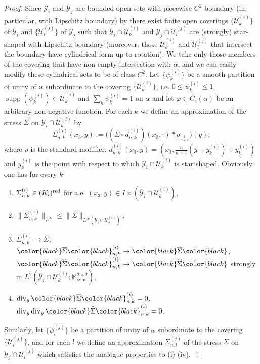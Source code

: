 \documentclass[reqno,10pt]{amsart}
\numberwithin{equation}{section}
\theoremstyle{remark}
\newcommand{\BLACK}{\color{black}}
\newcommand{\PINK}{\color{black}}
\newcommand{\calU}{\mathcal{U}}
\newcommand{\calY}{\mathcal{Y}}
\DeclareMathOperator{\sym}{sym}
\DeclareMathOperator{\supp}{supp}
\newcommand{\closure}[1]{\overline{#1}}
\renewcommand{\div}{\operatorname{div}}
\newcommand{\zerothI}[1]{\overline{#1}}
\newcommand{\firstI}[1]{\widehat{#1}}
\begin{document}
\begin{proof}
Since $\calY_i$ and $\calY_j$ are bounded open sets with piecewise $C^2$ boundary (in particular, with Lipschitz boundary) by \cite[Proposition 2.5.4]{Carbone.DeArcangelis.2002} there exist finite open coverings $\{\calU^{(i)}_k\}$ of $\closure{\calY}_i$ and $\{\calU^{(j)}_l\}$ of $\closure{\calY}_j$ such that $\calY_i \cap \calU^{(i)}_k$ and $\calY_j \cap \calU^{(j)}_l$ are (strongly) star-shaped with Lipschitz boundary
(moreover, those $\calU^{(i)}_k$ and $\calU^{(j)}_l$ that intersect the boundary have cylindrical form up to rotation). 
We take only those members of the covering that have non-empty intersection with $\alpha$, and we can easily modify these cylindrical sets to be of class $C^2$. 
Let $\{\psi^{(i)}_k\}$ be a smooth partition of unity of $\alpha$ subordinate to the covering $\{\calU^{(i)}_k\}$, i.e. $0 \leq \psi^{(i)}_k\leq 1$, $\supp(\psi_k^{(i)}) \subset \calU_k^{(i)}$ and $\sum_{k} \psi^{(i)}_k = 1$ on $\alpha$ and let $\varphi \in C_c(\alpha)$ be an arbitrary non-negative function. 
For each $k$ we define an approximation of the stress $\Sigma$ on $\calY_i \cap \calU^{(i)}_k$ 
by
\begin{equation} \label{prop4}
	\Sigma^{(i)}_{n,k}(x_3,y) := \big(\left( \Sigma \circ d_{n,k}^{(i)} \right)(x_3,\cdot) \ast \rho_{\frac{1}{n+1}}\big)(y),
\end{equation}
where 
$\rho$ is the standard mollifier,
$d^{(i)}_{n,k}(x_3,y) = \left( x_3,\tfrac{n}{n+1}(y-y_k^{(i)})+y_k^{(i)}\right)$ and $y_k^{(i)}$ is the point with respect to which $\calY_i \cap \calU^{(i)}_k$ is star shaped. 
Obviously one has for every $k$ 
\begin{enumerate}[label=(\roman*)]
\item $\Sigma_{n,k}^{(i)} \in (K_i)^{\rm red}$ for a.e. $(x_3,y) \in I \times (\closure{\calY}_i\cap \calU^{(i)}_k)$,
\item $\|\Sigma^{(i)}_{n,k}\|_{L^\infty} \leq \|\Sigma\|_{L^{\infty}(\calY_i \cap \calU^{(i)}_k)} $, 
\item $\Sigma^{(i)}_{n,k} \to \Sigma$,\, ${\PINK\zerothI{\Sigma}\BLACK}^{(i)}_{n,k} \to {\PINK\zerothI{\Sigma}\BLACK}$,\, ${\PINK\firstI{\Sigma}\BLACK}^{(i)}_{n,k} \to {\PINK\firstI{\Sigma}\BLACK}$ strongly in $L^2(\closure{\calY}_i\cap \calU^{(i)}_k;\mathbb{M}_{\sym}^{2 \times 2})$,
\item $\div_y {\PINK\zerothI{\Sigma}\BLACK}_{n,k}^{(i)}=0$,\, $\div_y \div_y{\PINK\firstI{\Sigma}\BLACK}_{n,k}^{(i)}=0$. 
\end{enumerate}
Similarly, let $\{\psi^{(j)}_l\}$ be a partition of unity of $\alpha$ subordinate to the covering $\{\calU^{(j)}_l\}$, and for each $l$ we define an approximation $\Sigma^{(j)}_{n,l}$ of the stress $\Sigma$ on $\calY_j \cap \calU^{(j)}_l$ which satisfies the analogue properties to (i)-(iv).


\end{proof}
\end{document}

